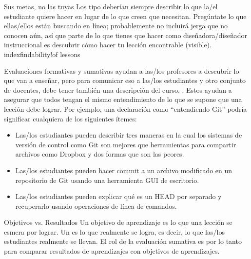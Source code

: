 \begin{aside}{Sus metas, no las tuyas}
Los tipo deberían siempre describir lo que la/el estudiante quiere hacer
en lugar de lo que creen que necesitan.
Pregúntate lo que ellas/ellos están buscando en línea;
probablemente no incluirá jerga que no conocen aún,
así que parte de lo que tienes que hacer como diseñadora/diseñador instruccional es
descubrir cómo hacer tu lección encontrable (visible). index{findability!of lessons}
\end{aside}


 
Evaluaciones formativas y sumativas ayudan a las/los profesores a descubrir lo que van a enseñar,
pero para comunicar eso a las/los estudiantes y otro conjunto de docentes,
debe tener también una descripción del curso.
.
Estos ayudan a asegurar que
todos tengan el mismo entendimiento de lo que se supone que una lección debe lograr.
Por ejemplo,
una declaración como ``entendiendo Git'' podría significar cualquiera de los siguientes ítemes:
 
\begin{itemize}
 
\item
  Las/los estudiantes pueden describir tres maneras
  en la cual los sistemas de versión de control como Git  son mejores que herramientas para compartir archivos como Dropbox
  y dos formas que son las peores.
 
\item
Las/los estudiantes pueden hacer commit a un archivo modificado en un repositorio de Git
usando una herramienta GUI de escritorio.
 
\item
  Las/los estudiantes pueden explicar qué es un HEAD por separado
 y recuperarlo usando operaciones de línea de comandos.
 
\end{itemize}
 

\begin{aside}{Objetivos vs. Resultados}
 Un objetivo de aprendizaje es lo que una lección se esmera por lograr.
 Un  es lo que realmente se logra,
 es decir, lo que las/los estudiantes realmente se llevan.
El rol de la evaluación sumativa es por lo tanto
para comparar resultados de aprendizajes con objetivos de aprendizajes.
\end{aside}
 
